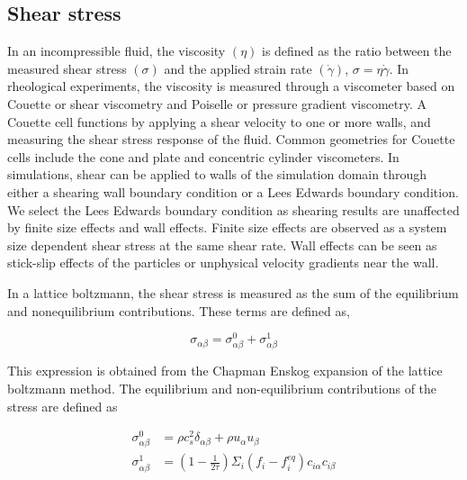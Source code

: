 \subsection{Shear stress}
\label{section:shear_viscosity}

In an incompressible fluid, the viscosity $(\eta)$ is defined as the ratio between the measured 
shear stress $(\sigma)$ and the applied strain rate $(\dot{\gamma})$, $\sigma = \eta \dot{\gamma}$. In rheological 
experiments, the viscosity is measured through a viscometer based on Couette or shear viscometry and Poiselle or 
pressure gradient viscometry. A Couette cell functions by applying a shear velocity to one or more walls, and measuring 
the shear stress response of the fluid. Common geometries for Couette cells include the cone and plate and concentric 
cylinder viscometers. In simulations, shear can be applied to walls of the simulation domain through either a shearing 
wall boundary condition or a Lees Edwards boundary condition. We select the Lees Edwards boundary condition as shearing 
results are unaffected by finite size effects and wall effects. Finite size effects are observed as a system size
dependent shear stress at the same shear rate. Wall effects can be seen as stick-slip effects of the particles or 
unphysical velocity gradients near the wall.

In a lattice boltzmann, the shear stress is measured as the sum of the equilibrium and nonequilibrium contributions.
\cite{kruger_shear_2009} These terms are defined as,

\begin{equation}
    \sigma_{\alpha \beta} = \sigma_{\alpha \beta}^{0} + \sigma_{\alpha \beta}^{1}
\end{equation}

This expression is obtained from the Chapman Enskog expansion of the lattice boltzmann method. The equilibrium and
non-equilibrium contributions of the stress are defined as

\begin{equation}
    \begin{split}
        \sigma_{\alpha \beta}^{0} &= \rho c_s^2 \delta_{\alpha \beta} + \rho u_{\alpha} u_{\beta} \\
        \sigma_{\alpha \beta}^{1} &= (1 - \frac{1}{2 \tau})\Sigma_{i} (f_{i} - f_{i}^{eq})c_{i \alpha}c_{i \beta} \\
    \end{split}
\end{equation}

